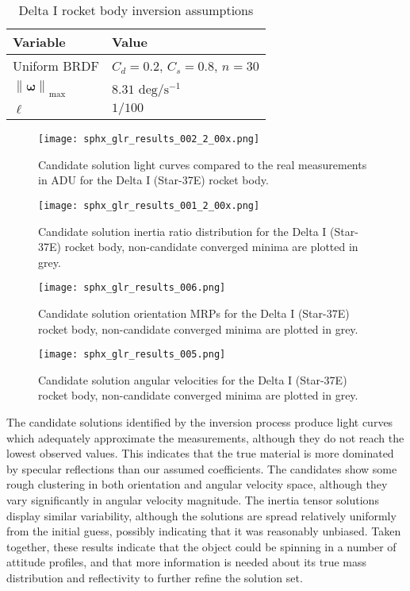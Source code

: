 \documentclass[a4paper,twocolumn]{spaceDebrisC} %
\newcommand{\vctr}[1]{\bm{#1}}
\newcommand{\norm}[1]{\left\lVert#1\right\rVert}
\newcommand{\figmed}[0]{0.4\textwidth}
\begin{document}
\begin{table}[H]
  \centering
  \caption{Delta I rocket body inversion assumptions}
  \vspace*{6pt}
  \begin{tabular}{|l|l|}
  \hline
  \textbf{Variable} & \textbf{Value} \\ \hline
 Uniform BRDF & $C_d=0.2$, $C_s=0.8$, $n=30$ \\ \hline
 $\norm{\vctr{\omega}}_\text{max}$ & $8.31$ $\text{deg} / \text{s}^{-1}$ \\ \hline
 $\ell$ & $1/100$ \\ \hline
\end{tabular}
  \label{tb:case2_ass}
\end{table}

\begin{figure*}[t]
  \centering
  \texttt{[image: sphx\_glr\_results\_002\_2\_00x.png]}
  \caption{Candidate solution light curves compared to the real measurements in ADU for the Delta I (Star-37E) rocket body.}
  \label{fig:case2_s}
\end{figure*}

\begin{figure}[H]
  \centering
  \texttt{[image: sphx\_glr\_results\_001\_2\_00x.png]}
  \caption{Candidate solution inertia ratio distribution for the Delta I (Star-37E) rocket body, non-candidate converged minima are plotted in grey.}
  \label{fig:case2_i}
\end{figure}

\begin{figure}[H]
  \centering
  \texttt{[image: sphx\_glr\_results\_006.png]}
  \caption{Candidate solution orientation MRPs for the Delta I (Star-37E) rocket body, non-candidate converged minima are plotted in grey.}
  \label{fig:case2_p}
\end{figure}

\begin{figure}[H]
  \centering
  \texttt{[image: sphx\_glr\_results\_005.png]}
  \caption{Candidate solution angular velocities for the Delta I (Star-37E) rocket body, non-candidate converged minima are plotted in grey.}
  \label{fig:case2_w}
\end{figure}

The candidate solutions identified by the inversion process produce light curves which adequately approximate the measurements, although they do not reach the lowest observed values. This indicates that the true material is more dominated by specular reflections than our assumed coefficients. The candidates show some rough clustering in both orientation and angular velocity space, although they vary significantly in angular velocity magnitude. The inertia tensor solutions display similar variability, although the solutions are spread relatively uniformly from the initial guess, possibly indicating that it was reasonably unbiased. Taken together, these results indicate that the object could be spinning in a number of attitude profiles, and that more information is needed about its true mass distribution and reflectivity to further refine the solution set.
\end{document}
